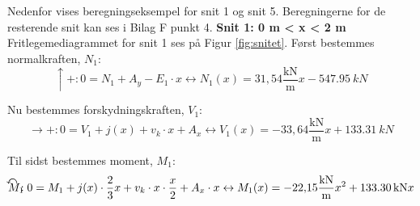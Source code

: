 Nedenfor vises beregningseksempel for snit 1 og snit 5. Beregningerne for de resterende snit kan ses i Bilag F punkt 4. 
\newline
\newline
\textbf{Snit 1: 0 m < x < 2 m}
\newline
Fritlegemediagrammet for snit 1 ses på Figur \ref{fig:snitet}.
\newline
\newline
Først bestemmes normalkraften, $N_1$:
\begin{equation}
	\uparrow+: 0 = N_1 + A_y - E_1 \cdot x \leftrightarrow N_1(x) = 31,\!54 \frac{\text{kN}}{\text{m}} x - \SI{547,95}{kN}
\end{equation}

Nu bestemmes forskydningskraften, $V_1$:
\begin{equation}
	\rightarrow+: 0 = V_1 + j(x) + v_k \cdot x + A_x \leftrightarrow V_1(x) = -33,\!64\frac{\text{kN}}{\text{m}} x + \SI{133,31}{kN}
\end{equation}

Til sidst bestemmes moment, $M_1$:
\begin{equation}
	\ALN{\text{$M_1$}}: 0 = M_1 + j(x) \cdot \frac{2}{3} x + v_k \cdot x \cdot \frac{x}{2} + A_x \cdot x \leftrightarrow M_1(x) = -22,\!15\frac{\text{kN}}{\text{m}} x^2 + \SI{133,30}{kN} x
\end{equation}

